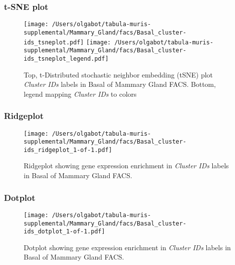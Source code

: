 \clearpage
\subsubsection{t-SNE plot}
\begin{figure}[h]
\centering
\texttt{[image: /Users/olgabot/tabula-muris-supplemental/Mammary\_Gland/facs/Basal\_cluster-ids\_tsneplot.pdf]}
\texttt{[image: /Users/olgabot/tabula-muris-supplemental/Mammary\_Gland/facs/Basal\_cluster-ids\_tsneplot\_legend.pdf]}
\caption{Top, t-Distributed stochastic neighbor embedding (tSNE) plot  \emph{Cluster IDs} labels in Basal of Mammary Gland FACS. Bottom, legend mapping \emph{Cluster IDs} to colors}
\end{figure}


\clearpage

\subsubsection{Ridgeplot}
\begin{figure}[h]
\centering
\texttt{[image: /Users/olgabot/tabula-muris-supplemental/Mammary\_Gland/facs/Basal\_cluster-ids\_ridgeplot\_1-of-1.pdf]}

\caption{ Ridgeplot  showing gene expression enrichment in \emph{Cluster IDs} labels in Basal of Mammary Gland FACS. }
\end{figure}


\clearpage

\subsubsection{Dotplot}
\begin{figure}[h]
\centering
\texttt{[image: /Users/olgabot/tabula-muris-supplemental/Mammary\_Gland/facs/Basal\_cluster-ids\_dotplot\_1-of-1.pdf]}

\caption{ Dotplot  showing gene expression enrichment in \emph{Cluster IDs} labels in Basal of Mammary Gland FACS. }
\end{figure}

